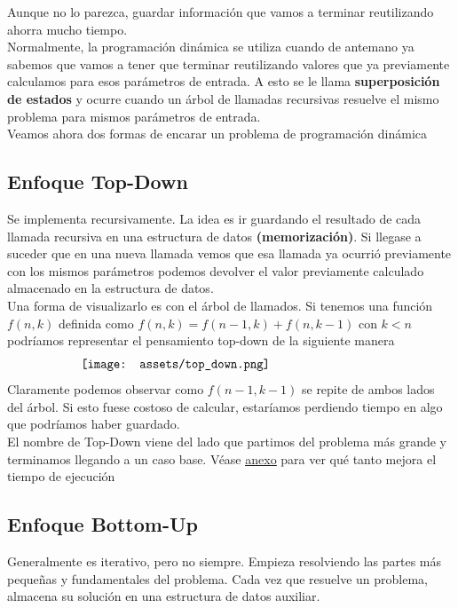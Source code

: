 \documentclass[10pt,a4paper]{article}
\begin{document}
Aunque no lo parezca, guardar información que vamos a terminar reutilizando ahorra mucho tiempo. \\

Normalmente, la programación dinámica se utiliza cuando de antemano ya sabemos que vamos a tener que terminar reutilizando valores que ya previamente calculamos para esos parámetros de entrada. A esto se le llama \textbf{superposición de estados} y ocurre cuando un árbol de llamadas recursivas resuelve el mismo problema para mismos parámetros de entrada. \\

Veamos ahora dos formas de encarar un problema de programación dinámica 

\subsection*{Enfoque Top-Down} 
Se implementa recursivamente. La idea es ir guardando el resultado de cada llamada recursiva en una estructura de datos \textbf{(memorización)}. Si llegase a suceder que en una nueva llamada vemos que esa llamada ya ocurrió previamente con los mismos parámetros podemos devolver el valor previamente calculado almacenado en la estructura de datos.  \\ 

Una forma de visualizarlo es con el árbol de llamados. Si tenemos una función $f(n, k)$ definida como $f(n, k) = f(n-1, k) + f(n, k-1)$ con $k<n$ podríamos representar el pensamiento top-down de la siguiente manera
\[\begin{minipage}[b]{0.7\textwidth}
    \texttt{[image: assets/top\_down.png]}
\end{minipage}\]
Claramente podemos observar como $f(n-1, k-1)$ se repite de ambos lados del árbol. Si esto fuese costoso de calcular, estaríamos perdiendo tiempo en algo que podríamos haber guardado. \\

El nombre de Top-Down viene del lado que partimos del problema más grande y terminamos llegando a un caso base.
Véase \hyperref[subsec:top_down_programacion_dinamica]{\underline{anexo}} para ver qué tanto mejora el tiempo de ejecución
\subsection*{Enfoque Bottom-Up}
Generalmente es iterativo, pero no siempre. Empieza resolviendo las partes más pequeñas y fundamentales del problema. Cada vez que resuelve un problema, almacena su solución en una estructura de datos auxiliar.
\end{document}
